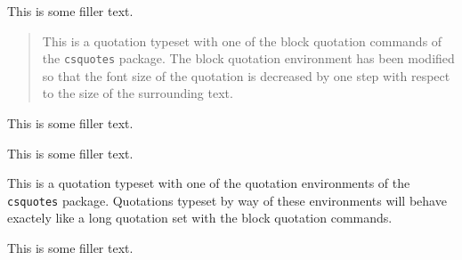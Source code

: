 \documentclass[a4paper]{article}
\newcommand*{\example}[1]{%
  \addvspace{\baselineskip}%
  \par\noindent\hspace{-4em}%
  \makebox[3em][r]{\textbf{Ex. #1}}%
  \hspace{1em}\ignorespaces}
\begin{document}
%
%
%

\newenvironment*{smallquote}
  {\quote\smaller}
  {\endquote}



\example{1}
This is some filler text. \blockquote{This is a quotation typeset with one of
the block quotation commands of the \texttt{csquotes} package. The block
quotation environment has been modified so that the font size of the quotation
is decreased by one step with respect to the size of the surrounding text.}
This is some filler text.


\example{2}
This is some filler text.
\begin{displayquote}
This is a quotation typeset with one of the quotation environments of the
\texttt{csquotes} package. Quotations typeset by way of these environments
will behave exactely like a long quotation set with the block quotation
commands.
\end{displayquote}
This is some filler text.

%
%
%
%
\end{document}
